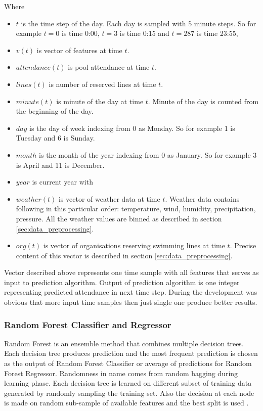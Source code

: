 \documentclass{article}
\begin{document}
Where 
\begin{itemize}
    \item $t$ is the time step of the day. Each day is sampled with 5 minute steps. So for example $t = 0$ is time 0:00, $t = 3$ is time 0:15 and $t = 287$ is time 23:55, 
    \item $v(t)$ is vector of features at time $t$.
    \item $attendance(t)$ is pool attendance at time $t$.
    \item $lines(t)$ is number of reserved lines at time $t$.
    \item $minute(t)$ is minute of the day at time $t$. Minute of the day is counted from the beginning of the day.
    \item $day$ is the day of week indexing from 0 as Monday. So for example 1 is Tuesday and 6 is Sunday.
    \item $month$ is the month of the year indexing from 0 as January. So for example 3 is April and 11 is December.
    \item $year$ is current year with
    \item $weather(t)$ is vector of weather data at time $t$. Weather data contains following in this particular order: temperature, wind, humidity, precipitation, pressure. All the weather values are binned as described in section \ref{sec:data_preprocessing}.
    \item $org(t)$ is  vector of organisations reserving swimming lines at time $t$. Precise content of this vector is described in section \ref{sec:data_preprocessing}.
\end{itemize}

Vector described above represents one time sample with all features that serves as input to prediction algorithm. Output of prediction algorithm is one integer representing predicted attendance in next time step. During the development was obvious that more input time samples then just single one produce better results. 

\subsubsection{Random Forest Classifier and Regressor}
Random Forest is an ensemble method that combines multiple decision trees. Each decision tree produces prediction and the most frequent prediction is chosen as the output of Random Forest Classifier or average of predictions for Random Forest Regressor. Randomness in name comes from random bagging during learning phase. Each decision tree is learned on different subset of training data generated by randomly sampling the training set. Also the decision at each node is made on random sub-sample of available features and the best split is used \citep{yiu2019randomforest} \citep{wiki2019randomforest}.
\end{document}
